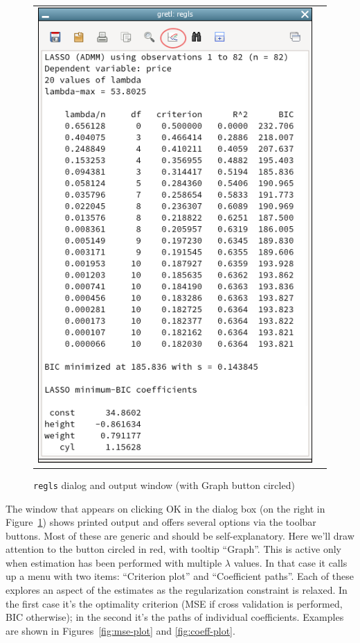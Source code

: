 \documentclass{article}
\begin{document}
\begin{figure}[htbp]
\begin{tabular}{cc}
    \includegraphics[scale=0.5]{regls_output}
  \end{tabular}
  \caption{\texttt{regls} dialog and output window (with Graph button circled)}
  \label{fig:regls-combo}
\end{figure}

The window that appears on clicking \textsf{OK} in the dialog box (on
the right in Figure~\ref{fig:regls-combo}) shows printed output and
offers several options via the toolbar buttons.  Most of these are
generic and should be self-explanatory. Here we'll draw attention to
the button circled in red, with tooltip ``Graph''. This is active only
when estimation has been performed with multiple $\lambda$ values. In
that case it calls up a menu with two items: ``Criterion plot'' and
``Coefficient paths''. Each of these explores an aspect of the
estimates as the regularization constraint is relaxed. In the first
case it's the optimality criterion (MSE if cross validation is
performed, BIC otherwise); in the second it's the paths of individual
coefficients.  Examples are shown in Figures~\ref{fig:mse-plot} and
\ref{fig:coeff-plot}.
\end{document}
